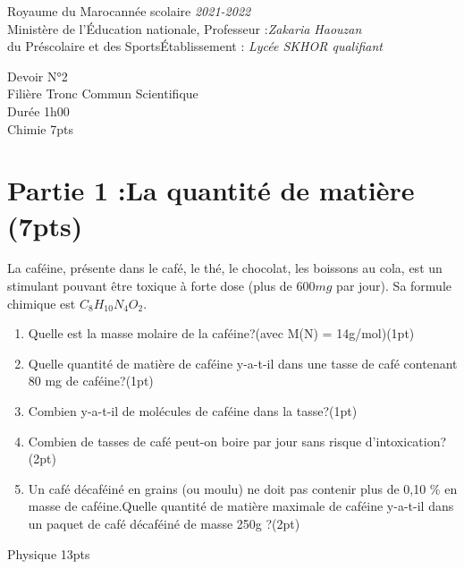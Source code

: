 \documentclass[12pt]{article}
\newcommand\headerMe[2]{\noindent{}#1\hfill#2}
\begin{document}
\headerMe{Royaume du Maroc}{année scolaire \emph{2021-2022}}\\
\headerMe{Ministère de l'Éducation nationale, }{  Professeur :\emph{Zakaria Haouzan}}\\
\headerMe{du Préscolaire et des Sports}{Établissement : \emph{Lycée SKHOR qualifiant}}\\

\begin{center}
Devoir  N°2 \\
   Filière Tronc Commun Scientifique\\
Durée 1h00
\\
    \vspace{.2cm}
\hrulefill
\Large{Chimie 7pts}
\hrulefill\\

\end{center}
 \section*{Partie 1 :La quantité de matière \dotfill (7pts) }
La caféine, présente dans le café, le thé, le chocolat, les boissons au cola, est un stimulant pouvant être toxique à forte dose (plus de $600 mg$ par jour). Sa formule chimique est $C_8H_{10}N_4O_2$.

\begin{enumerate}
    \item Quelle est la masse molaire de la caféine?(avec M(N) = 14g/mol)\dotfill(1pt)
    \item Quelle quantité de matière de caféine y-a-t-il dans une tasse de café contenant 80 mg de caféine?\dotfill(1pt)
    \item Combien y-a-t-il de molécules de caféine dans la tasse?\dotfill(1pt)
    \item Combien de tasses de café peut-on boire par jour sans risque d’intoxication?\dotfill(2pt)
        \item Un café décaféiné en grains (ou moulu) ne doit pas contenir plus de 0,10 \% en masse de caféine.Quelle quantité de matière maximale de caféine y-a-t-il dans un paquet de café décaféiné de masse
            250g ?\dotfill(2pt)
\end{enumerate}

\begin{center}
\hrulefill
\Large{Physique 13pts}
\hrulefill\\
\end{center}
\end{document}

